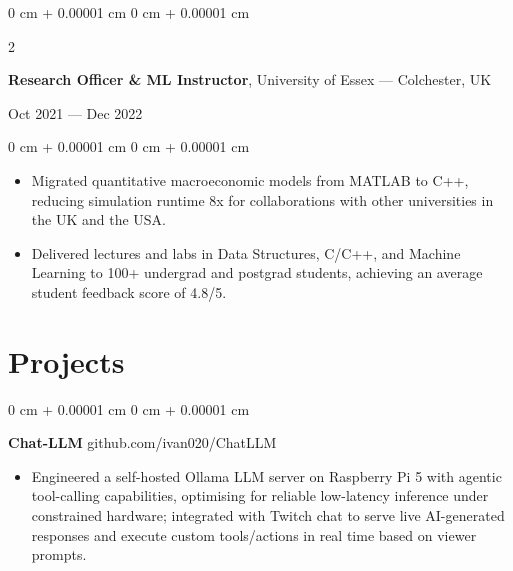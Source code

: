 \documentclass[6pt, letterpaper]{article}
\newenvironment{highlights}{
    \begin{itemize}[
        topsep=0.03 cm,
        parsep=0.03 cm,
        partopsep=0pt,
        itemsep=0pt,
        leftmargin=0 cm + 10pt
    ]
}{
    \end{itemize}
} %
\newenvironment{onecolentry}{
    \begin{adjustwidth}{
        0 cm + 0.00001 cm
    }{
        0 cm + 0.00001 cm
    }
}{
    \end{adjustwidth}
} %
\newenvironment{twocolentry}[2][]{
    \onecolentry
    \def\secondColumn{#2}
    \setcolumnwidth{\fill, 4.5 cm}
    \begin{paracol}{2}
}{
    \switchcolumn \raggedleft \secondColumn
    \end{paracol}
    \endonecolentry
} %
\begin{document}
        \begin{twocolentry}{Oct 2021 --- Dec 2022}
        \textbf{Research Officer \& ML Instructor}, University of Essex --- Colchester, UK
        \end{twocolentry}

        \begin{onecolentry}
        \begin{highlights}
        \item Migrated quantitative macroeconomic models from MATLAB to C++, reducing simulation runtime 8x for collaborations with other universities in the UK and the USA.
        \item Delivered lectures and labs in Data Structures, C/C++, and Machine Learning to 100+ undergrad and postgrad students, achieving an average student feedback score of 4.8/5.
        \end{highlights}
        \end{onecolentry}


    \section{Projects}

    \begin{onecolentry}
        \textbf{Chat-LLM} \hfill github.com/ivan020/ChatLLM

        \begin{highlights}

        \item Engineered a self-hosted Ollama LLM server on Raspberry Pi 5 with agentic tool-calling capabilities, optimising for reliable low-latency inference under constrained hardware; integrated with Twitch chat to serve live AI-generated responses and execute custom tools/actions in real time based on viewer prompts.

        \end{highlights}
    \end{onecolentry}
\end{document}

